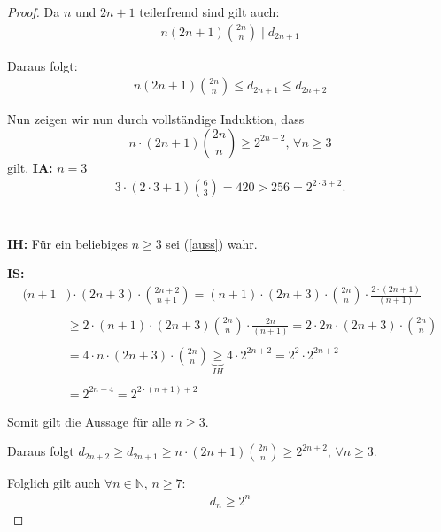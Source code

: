 \documentclass[12pt,oneside]{article}
\theoremstyle{remark}
\theoremstyle{definition}
\begin{document}
\begin{proof}
Da $n $ und $2n + 1$ teilerfremd sind gilt auch:
\begin{align*}
    n(2n + 1) {2n \choose n} \mid d_{2n + 1}
\end{align*}

Daraus folgt:
\begin{align*}
    n (2n + 1){2n \choose n} \leq d_{2n + 1} \leq d_{2n + 2}
\end{align*}

Nun zeigen wir nun durch vollständige Induktion, dass 
\begin{equation}\label{auss}
    n \cdot (2n + 1) {2n \choose n} \geq 2^{2n + 2}, \, \forall n \geq 3
\end{equation}
gilt.\newline\newline
\textbf{IA:} $n = 3$
\begin{align*}
    3 \cdot (2 \cdot 3 + 1) { 6 \choose 3} = 420 > 256 = 2^{2 \cdot 3 + 2}.
\end{align*}
\\
\\
\textbf{IH:} Für ein beliebiges $n \geq 3$ sei (\ref{auss}) wahr.\newline\newline

\textbf{IS:}
\begin{align*}
    (n + 1&) \cdot (2n + 3) \cdot {2n + 2 \choose n + 1} =(n + 1) \cdot (2n + 3) \cdot {2n \choose n} \cdot \frac{2 \cdot (2n + 1)}{(n + 1)} \\
    \\
    &\geq 2 \cdot (n + 1) \cdot (2n + 3) {2n \choose n} \cdot \frac{2n}{(n + 1)} = 2 \cdot 2n \cdot (2n + 3) \cdot {2n \choose n} \\
    \\ 
    &= 4 \cdot n \cdot (2n + 3) \cdot {2n \choose n} \underbrace{\geq}_{IH} 4 \cdot 2^{2n + 2} = 2^2 \cdot 2^{2n + 2}\\
    \\
    &= 2^{2n + 4} = 2^{2 \cdot (n + 1) + 2} 
\end{align*}

Somit gilt die Aussage für alle $n \geq 3$.\newline\newline 

Daraus folgt $d_{2n + 2} \geq d_{2n + 1} \geq  n \cdot (2n + 1) {2n \choose n} \geq 2^{2n + 2}, \, \forall n \geq 3$.\newline\newline

Folglich gilt auch $\forall n \in \mathbb{N}, \, n \geq 7$:
\begin{align*}
    d_{n} \geq 2^{n}
\end{align*}
\end{proof}
\end{document}
